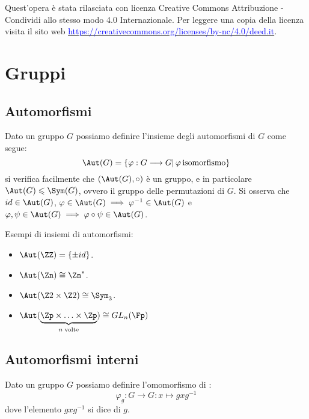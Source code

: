 \documentclass[11pt]{scrartcl}
\begin{document}
Quest'opera è stata rilasciata con licenza Creative Commons Attribuzione - Condividi allo stesso modo 4.0 Internazionale. Per leggere
una copia della licenza visita il sito web \href{http://creativecommons.org/licenses/by-sa/4.0/deed.it}{\textcolor{blue}{https://creativecommons.org/licenses/by-nc/4.0/deed.it}}.\\

\newpage
\section{Gruppi}
\subsection{Automorfismi}
Dato un gruppo $G$ possiamo definire l'insieme degli automorfismi di $G$ come segue:
    \[ \Aut(G) = \{\varphi : G \longrightarrow G |\, \varphi \, \text{isomorfismo}\}
        \]
si verifica facilmente che $(\Aut(G), \circ)$ è un gruppo, e in particolare $\Aut(G) \leqslant \Sym(G)$,
ovvero il gruppo delle permutazioni di $G$. Si osserva che $id \in \Aut(G)$, $\varphi \in \Aut(G) \implies 
\varphi^{-1} \in \Aut(G)$ e $\varphi,\psi \in \Aut(G) \implies \varphi \circ \psi \in \Aut(G)$.

\begin{example}
    Esempi di insiemi di automorfismi:
        \begin{itemize}
            \item $\Aut(\ZZ) = \{\pm id\}$.
            \item $\Aut(\Zn) \cong \Zn^*$.
            \item $\Aut(\Z2 \times \Z2) \cong \Sym_3$.
            \item $\Aut(\underbrace{\Zp \times \ldots \times \Zp}_{n \;\text{volte}}) \cong GL_n(\Fp)$
        \end{itemize}
\end{example}

\subsection{Automorfismi interni}
\begin{definition}
    Dato un gruppo $G$ possiamo definire l'omomorfismo di :
        \[ \varphi_g : G \longrightarrow G : x \longmapsto gxg^{-1}
            \]
    dove l'elemento $gxg^{-1}$ si dice  di $g$.
\end{definition}
\end{document}
